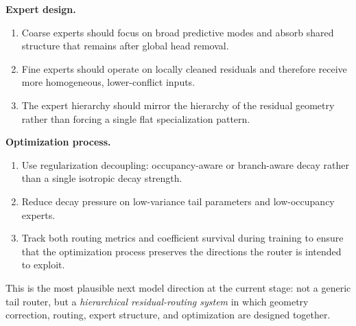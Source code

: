 \documentclass[11pt]{article}
\begin{document}
\textbf{Expert design.}
\begin{enumerate}[leftmargin=1.5em]
    \item Coarse experts should focus on broad predictive modes and absorb shared structure that remains after global head removal.
    \item Fine experts should operate on locally cleaned residuals and therefore receive more homogeneous, lower-conflict inputs.
    \item The expert hierarchy should mirror the hierarchy of the residual geometry rather than forcing a single flat specialization pattern.
\end{enumerate}

\textbf{Optimization process.}
\begin{enumerate}[leftmargin=1.5em]
    \item Use regularization decoupling: occupancy-aware or branch-aware decay rather than a single isotropic decay strength.
    \item Reduce decay pressure on low-variance tail parameters and low-occupancy experts.
    \item Track both routing metrics and coefficient survival during training to ensure that the optimization process preserves the directions the router is intended to exploit.
\end{enumerate}

This is the most plausible next model direction at the current stage: not a generic tail router, but a \emph{hierarchical residual-routing system} in which geometry correction, routing, expert structure, and optimization are designed together.
\end{document}
